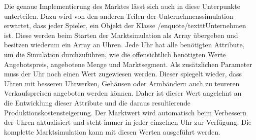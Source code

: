 Die genaue Implementierung des Marktes lässt sich auch in diese Unterpunkte unterteilen. Dazu wird von den anderen Teilen der Unternehmenssimulation erwartet, dass jeder Spieler, ein Objekt der Klasse /enquote{/texttt{Unternehmen}} ist. Diese werden beim Starten der Marktsimulation als Array übergeben und besitzen wiederum ein Array an Uhren. Jede Uhr hat alle benötigten Attribute, um die Simulation durchzuführen, wie die offensichtlich benötigten Werte Angebotspreis, angebotene Menge und Marktsegment. Als zusätzlichen Parameter muss der Uhr noch einen Wert zugewiesen werden. Dieser spiegelt wieder, dass Uhren mit besseren Uhrwerken, Gehäusen oder Armbändern auch zu teureren Verkaufspreisen angeboten werden können. Daher ist dieser Wert angelehnt an die Entwicklung dieser Attribute und die daraus resultierende Produktionskostensteigerung. Der Marktwert wird automatisch beim Verbessern der Uhren aktualisiert und steht immer in jeder einzelnen Uhr zur Verfügung. Die komplette Marktsimulation kann mit diesen Werten ausgeführt werden.

